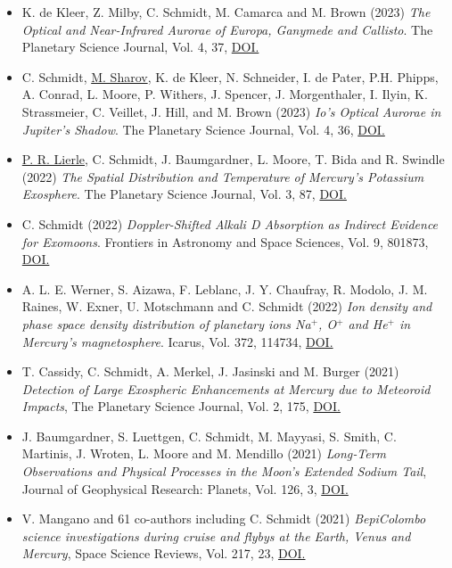 \documentclass[12pt]{report}
\begin{document}
\begin{itemize} \itemsep -2pt %
  \item K. de Kleer, Z. Milby, C. Schmidt, M. Camarca and M. Brown (2023) \textit{The Optical and Near-Infrared Aurorae of Europa, Ganymede and Callisto}. The Planetary Science Journal, Vol. 4, 37, \href{https://doi.org/10.3847/PSJ/acb53c}{DOI.} 
  \item C. Schmidt, \underline{M. Sharov}, K. de Kleer, N. Schneider, I. de Pater, P.H. Phipps, A. Conrad, L. Moore, P. Withers, J. Spencer, J. Morgenthaler, I. Ilyin, K. Strassmeier, C. Veillet, J. Hill, and M. Brown (2023) \textit{Io’s Optical Aurorae in Jupiter’s Shadow}. The Planetary Science Journal, Vol. 4, 36, \href{https://doi.org/10.3847/PSJ/ac85b0}{DOI.} 
  \item \underline{P. R. Lierle}, C. Schmidt, J. Baumgardner, L. Moore, T. Bida and R. Swindle (2022) \textit{The Spatial Distribution and Temperature of Mercury’s Potassium Exosphere}. The Planetary Science Journal, Vol. 3, 87, \href{https://doi.org/10.3847/PSJ/ac5c4d}{DOI.} 
  \item C. Schmidt (2022) \textit{Doppler-Shifted Alkali D Absorption as Indirect Evidence for Exomoons}. Frontiers in Astronomy and Space Sciences, Vol. 9, 801873, \href{https://doi.org/10.3389/fspas.2022.801873}{DOI.}
  \item A. L. E. Werner, S. Aizawa, F. Leblanc, J. Y. Chaufray, R. Modolo, J. M. Raines, W. Exner, U. Motschmann and C. Schmidt (2022) \textit{Ion density and phase space density distribution of planetary ions Na$^+$, O$^+$ and He$^+$ in Mercury's magnetosphere}. Icarus, Vol. 372, 114734, \href{https://doi.org/10.1016/j.icarus.2021.114734}{DOI.}
  \item  T. Cassidy, C. Schmidt, A. Merkel, J. Jasinski and M. Burger (2021) \textit{Detection of Large Exospheric Enhancements at Mercury due to Meteoroid Impacts}, The Planetary Science Journal, Vol. 2, 175, \href{https://doi.org/10.3847/PSJ/ac1a19}{DOI.}
  \item J. Baumgardner, S. Luettgen, C. Schmidt, M. Mayyasi, S. Smith, C. Martinis, J. Wroten, L. Moore and M. Mendillo (2021) \textit{Long‐Term Observations and Physical Processes in the Moon’s Extended Sodium Tail}, Journal of Geophysical Research: Planets, Vol. 126, 3, \href{https://doi.org/10.1029/2020JE006671}{DOI.}
  \item V. Mangano and 61 co-authors including C. Schmidt (2021) \textit{BepiColombo science investigations during cruise and flybys at the Earth, Venus and Mercury}, Space Science Reviews, Vol. 217, 23, \href{https://doi.org/10.1007/s11214-021-00797-9}{DOI.} 

\end{itemize}
\end{document}
